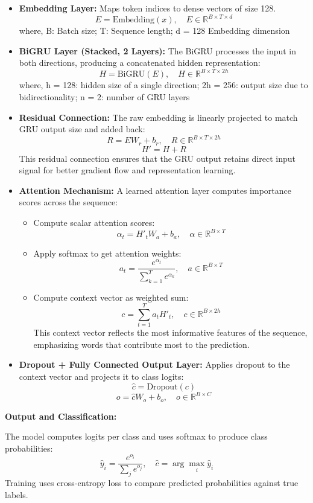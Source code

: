 \documentclass{article}
\begin{document}
\begin{itemize}
\item \textbf{Embedding Layer:} Maps token indices to dense vectors of size 128.
\[
E = \text{Embedding}(x), \quad E \in \mathbb{R}^{B \times T \times d}
\]
where, B: Batch size; T: Sequence length; d = 128 Embedding dimension
\item \textbf{BiGRU Layer (Stacked, 2 Layers):} The BiGRU processes the input in both directions, producing a concatenated hidden representation:
\[
H = \text{BiGRU}(E), \quad H \in \mathbb{R}^{B \times T \times 2h}
\]
where, h = 128: hidden size of a single direction; 2h = 256: output size due to bidirectionality; n = 2: number of GRU layers
\item \textbf{Residual Connection:} The raw embedding is linearly projected to match GRU output size and added back:
\[
R = E W_r + b_r, \quad R \in \mathbb{R}^{B \times T \times 2h}
\]
\[
H' = H + R
\]
This residual connection ensures that the GRU output retains direct input signal for better gradient flow and representation learning.
\item \textbf{Attention Mechanism:} A learned attention layer computes importance scores across the sequence:
\begin{itemize}
\item Compute scalar attention scores:
\[
\alpha_t = H'_t W_a + b_a, \quad \alpha \in \mathbb{R}^{B \times T}
\]

\item Apply softmax to get attention weights:
\[
a_t = \frac{e^{\alpha_t}}{\sum_{k=1}^{T} e^{\alpha_k}}, \quad a \in \mathbb{R}^{B \times T}
\]
\item Compute context vector as weighted sum:
\[
c = \sum_{t=1}^{T} a_t H'_t, \quad c \in \mathbb{R}^{B \times 2h}
\]
This context vector reflects the most informative features of the sequence, emphasizing words that contribute most to the prediction.
\end{itemize}

\item \textbf{Dropout + Fully Connected Output Layer:} Applies dropout to the context vector and projects it to class logits:
\[
\hat{c} = \text{Dropout}(c)
\]
\[
o = \hat{c} W_o + b_o, \quad o \in \mathbb{R}^{B \times C}
\]
\end{itemize}

\textbf{Output and Classification:}

The model computes logits per class and uses softmax to produce class probabilities:
\[
\hat{y}_i = \frac{e^{o_i}}{\sum_j e^{o_j}}, \quad \hat{c} = \arg\max_i \hat{y}_i
\]
Training uses cross-entropy loss to compare predicted probabilities against true labels.
\end{document}
